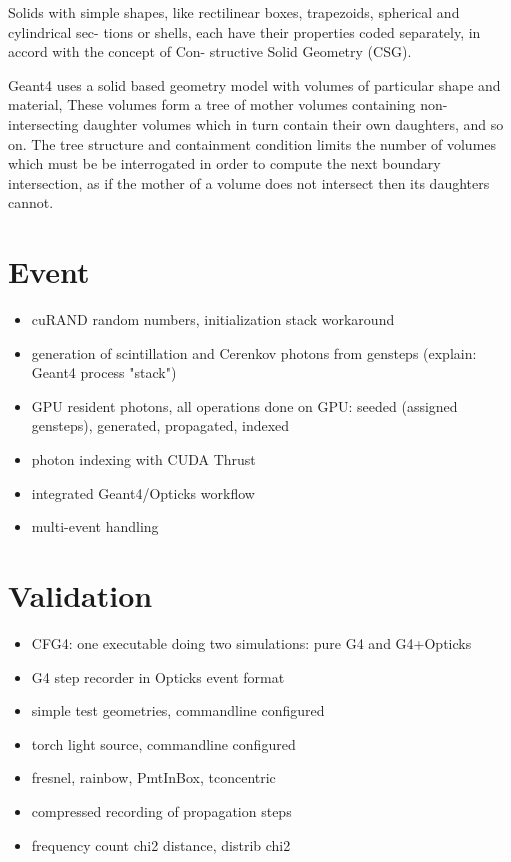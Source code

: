 \documentclass[a4paper]{jpconf}
\begin{document}
Solids with simple shapes, like rectilinear boxes, trapezoids, spherical and cylindrical sec- tions or shells, each have their properties coded separately, in accord with the concept of Con- structive Solid Geometry (CSG). 



Geant4 uses a solid based geometry model with volumes of particular shape and material,
These volumes form a tree of mother volumes
containing non-intersecting daughter volumes which in turn contain their own daughters, and so on.
The tree structure and containment condition limits the number of volumes which
must be be interrogated in order to compute the next boundary intersection, as if the
mother of a volume does not intersect then its daughters cannot.







\section{Event}

\begin{itemize}
\item cuRAND random numbers, initialization stack workaround
\item generation of scintillation and Cerenkov photons from gensteps (explain: Geant4 process "stack")
\item GPU resident photons, all operations done on GPU: seeded (assigned gensteps), generated, propagated, indexed 
\item photon indexing with CUDA Thrust 
\item integrated Geant4/Opticks workflow
\item multi-event handling 
\end{itemize}

\section{Validation}

\begin{itemize}
\item CFG4: one executable doing two simulations: pure G4 and G4+Opticks 
\item G4 step recorder in Opticks event format
\item simple test geometries, commandline configured 
\item torch light source, commandline configured 
\item fresnel, rainbow, PmtInBox, tconcentric
\item compressed recording of propagation steps
\item frequency count chi2 distance, distrib chi2
\end{itemize}
\end{document}
